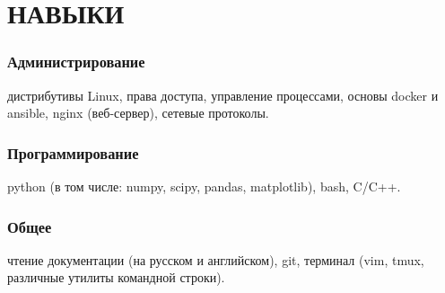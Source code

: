 \section{НАВЫКИ}

    \subsubsection{Администрирование}
    дистрибутивы Linux, права доступа, управление процессами, основы docker и ansible, nginx (веб-сервер),
    сетевые протоколы.
    
    \subsubsection{Программирование}
    python (в том числе: numpy, scipy, pandas, matplotlib), bash, C/C++.
    
    \subsubsection{Общее}
    чтение документации (на русском и английском), git, терминал (vim, tmux, различные утилиты командной строки).
    
    \vspace{.5em}
